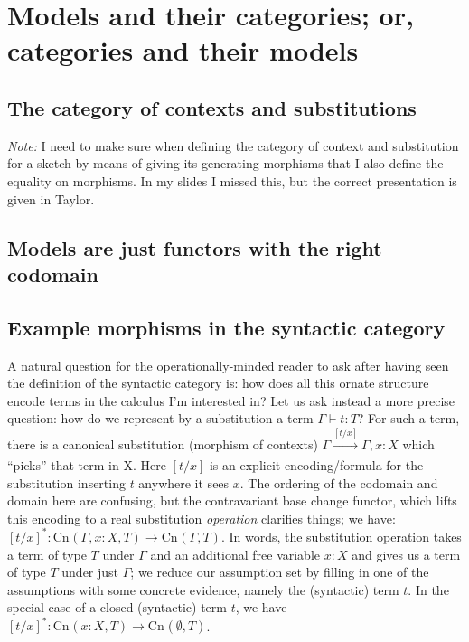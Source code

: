\documentclass[12pt,twoside]{reedthesis}
\begin{document}
\section{Models and their categories; or, categories and their models}

\subsection{The category of contexts and substitutions}
\emph{Note:} I need to make sure when defining the category of context and substitution for a sketch by means of giving its generating morphisms that I also define the equality on morphisms. In my slides I missed this, but the correct presentation is given in Taylor.

\subsection{Models are just functors with the right codomain}

\newcommand{\clone}[3]{{\text{Cn}_{#1}(#2,#3)}}

\subsection{Example morphisms in the syntactic category}
A natural question for the operationally-minded reader to ask after having seen
the definition of the syntactic category is: how does all this ornate structure
encode terms in the calculus I'm interested in? Let us ask instead a more
precise question: how do we represent by a substitution a term \(\Gamma \vdash t : T\)?
For such a term, there is a canonical substitution (morphism of contexts)
\( \Gamma \xrightarrow[]{[t/x]} \Gamma,x:X \) which ``picks'' that term in X. Here $[t/x]$
is an explicit encoding/formula for the substitution inserting $t$ anywhere it
sees $x$. The ordering of the codomain and domain here are confusing, but the
contravariant base change functor, which lifts this encoding to a real
substitution \emph{operation} clarifies things; we have:
\( [t/x]^{*} : \clone{}{\Gamma, x:X}{T} \longrightarrow \clone{}{\Gamma}{T} \). In words, the
substitution operation takes a term of type $T$ under $\Gamma$ and an additional free
variable $x:X$ and gives us a term of type $T$ under just $\Gamma$; we reduce our
assumption set by filling in one of the assumptions with some concrete evidence,
namely the (syntactic) term $t$. In the special case of a closed (syntactic)
term $t$, we have \( [t/x]^{*} : \clone{}{x:X}{T} \longrightarrow \clone{}{\emptyset}{T}\).
\end{document}
